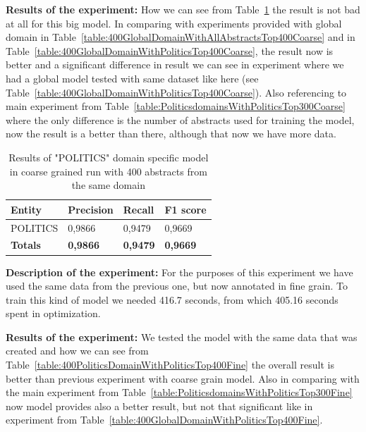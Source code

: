 \documentclass[thesis=M,english]{FITthesis}[2018/05/30]
\begin{document}
\textbf{Results of the experiment:} How we can see from Table~\ref{table:400PoliticsDomainWithPoliticsTop400Coarse} the result is not bad at all for this big model. In comparing with experiments provided with global domain in Table~\ref{table:400GlobalDomainWithAllAbstractsTop400Coarse} and in Table~\ref{table:400GlobalDomainWithPoliticsTop400Coarse}, the result now is better and a significant difference in result we can see in experiment where we had a global model tested with same dataset like here (see Table~\ref{table:400GlobalDomainWithPoliticsTop400Coarse}). Also referencing to main experiment from Table~\ref{table:PoliticsdomainsWithPoliticsTop300Coarse} where the only difference is the number of abstracts used for training the model, now the result is a better than there, although that now we have more data.  

	\begin{table}[H]\centering
		\begin{tabular}{|l|l|l|l|}
			\hline {\textbf{Entity}} & {\textbf{Precision}} & {\textbf{Recall}} & {\textbf{F1 score}}\\\hline
				POLITICS & 0,9866 & 0,9479 & 0,9669\\\hline
				\textbf{Totals} & \textbf{0,9866} & \textbf{0,9479} & \textbf{0,9669}\\\hline
		\end{tabular}
		\caption{Results of "POLITICS" domain specific model in coarse grained run with 400 abstracts from the same domain \label{table:400PoliticsDomainWithPoliticsTop400Coarse}}
	\end{table}

\textbf{Description of the experiment:} For the purposes of this experiment we have used the same data from the previous one, but now annotated in fine grain. To train this kind of model we needed 416.7 seconds, from which 405.16 seconds spent in optimization. 

\textbf{Results of the experiment:} We tested the model with the same data that was created and how we can see from Table~\ref{table:400PoliticsDomainWithPoliticsTop400Fine} the overall result is better than previous experiment with coarse grain model. Also in comparing with the main experiment from Table~\ref{table:PoliticsdomainsWithPoliticsTop300Fine} now model provides also a better result, but not that significant like in experiment from Table~\ref{table:400GlobalDomainWithPoliticsTop400Fine}. 
\end{document}
